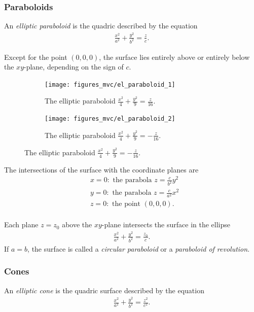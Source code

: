 \documentclass[12pt,letterpaper,reqno]{article}
\numberwithin{equation}{section}
\begin{document}
{\subsubsection{Paraboloids}
\begin{defn}
	An \emph{elliptic paraboloid} is the quadric described by the equation
	\begin{align*}
		\frac{x^2}{a^2}+\frac{y^2}{b^2}=\frac{z}{c}.
	\end{align*}
\end{defn}
Except for the point $(0,0,0)$, the surface lies entirely above or entirely below the $xy$-plane, depending on the sign of $c$.

\begin{figure}[h]
\centering
\begin{subfigure}{.5\textwidth}
  \centering
  \texttt{[image: figures\_mvc/el\_paraboloid\_1]}
  \caption{The elliptic paraboloid $\frac{x^2}{4}+\frac{y^2}{9}=\frac{z}{16}$.}
\end{subfigure}%
\begin{subfigure}{.5\textwidth}
  \centering
  \texttt{[image: figures\_mvc/el\_paraboloid\_2]}
  \caption{The elliptic paraboloid $\frac{x^2}{4}+\frac{y^2}{9}=-\frac{z}{16}$.}
\end{subfigure}
\end{figure}
The intersections of the surface with the coordinate planes are
\begin{align*}
	&x=0: \text{ the parabola } z=\frac{c}{b^2}y^2 \\
	&y=0: \text{ the parabola } z=\frac{c}{a^2}x^2 \\
	&z=0: \text{ the point } (0,0,0). \\
\end{align*}

Each plane $z=z_0$ above the $xy$-plane intersects the surface in the ellipse
\begin{align*}
	\frac{x^2}{a^2}+\frac{y^2}{b^2}=\frac{z_0}{c}.
\end{align*}
If $a=b$, the surface is called a \emph{circular paraboloid} or a \emph{paraboloid of revolution}.

\subsubsection{Cones}
\begin{defn}[Cone]
	An \emph{elliptic cone} is the quadric surface described by the equation
	\begin{align*}
		\frac{x^2}{a^2}+\frac{y^2}{b^2}=\frac{z^2}{c^2}.
	\end{align*}
\end{defn}

}
\end{document}
